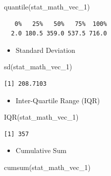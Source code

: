 \documentclass[
  letterpaper,
  DIV=11,
  numbers=noendperiod]{scrreprt}
\newenvironment{Shaded}{\begin{snugshade}}{\end{snugshade}}
\newcommand{\FunctionTok}[1]{\textcolor[rgb]{0.28,0.35,0.67}{#1}}
\newcommand{\NormalTok}[1]{\textcolor[rgb]{0.00,0.23,0.31}{#1}}
\providecommand{\tightlist}{%
  \setlength{\itemsep}{0pt}\setlength{\parskip}{0pt}}\usepackage{longtable,booktabs,array}
\begin{document}
\begin{Shaded}
\begin{Highlighting}[]
\FunctionTok{quantile}\NormalTok{(stat\_math\_vec\_1)}
\end{Highlighting}
\end{Shaded}

\begin{verbatim}
   0%   25%   50%   75%  100% 
  2.0 180.5 359.0 537.5 716.0 
\end{verbatim}

\begin{itemize}
\tightlist
\item
  Standard Deviation
\end{itemize}

\begin{Shaded}
\begin{Highlighting}[]
\FunctionTok{sd}\NormalTok{(stat\_math\_vec\_1)}
\end{Highlighting}
\end{Shaded}

\begin{verbatim}
[1] 208.7103
\end{verbatim}

\begin{itemize}
\tightlist
\item
  Inter-Quartile Range (IQR)
\end{itemize}

\begin{Shaded}
\begin{Highlighting}[]
\FunctionTok{IQR}\NormalTok{(stat\_math\_vec\_1)}
\end{Highlighting}
\end{Shaded}

\begin{verbatim}
[1] 357
\end{verbatim}

\begin{itemize}
\tightlist
\item
  Cumulative Sum
\end{itemize}

\begin{Shaded}
\begin{Highlighting}[]
\FunctionTok{cumsum}\NormalTok{(stat\_math\_vec\_1)}
\end{Highlighting}
\end{Shaded}
\end{document}
